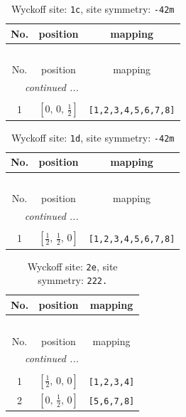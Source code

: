 \documentclass[fleqn,8pt]{jsarticle}
\begin{document}
\begin{longtable}{ccc}
\caption{Wyckoff site: {\tt 1c}, site symmetry: {\tt -42m}}
 \\
 \hline \hline
No. & position & mapping \\ \hline \endfirsthead

\multicolumn{2}{l}{\tablename\ \thetable{}} \\
 \hline \hline
No. & position & mapping \\ \hline \endhead

 \hline \hline
\multicolumn{2}{r}{\footnotesize\it continued ...} \\ \endfoot

 \hline \hline
\multicolumn{2}{r}{} \\ \endlastfoot

1 & $\left[ 0,\, 0,\, \frac{1}{2} \right]$ & {\tt [1,2,3,4,5,6,7,8]} \\
\end{longtable}
\renewcommand{\arraystretch}{1.2}
\begin{longtable}{ccc}
\caption{Wyckoff site: {\tt 1d}, site symmetry: {\tt -42m}}
 \\
 \hline \hline
No. & position & mapping \\ \hline \endfirsthead

\multicolumn{2}{l}{\tablename\ \thetable{}} \\
 \hline \hline
No. & position & mapping \\ \hline \endhead

 \hline \hline
\multicolumn{2}{r}{\footnotesize\it continued ...} \\ \endfoot

 \hline \hline
\multicolumn{2}{r}{} \\ \endlastfoot

1 & $\left[ \frac{1}{2},\, \frac{1}{2},\, 0 \right]$ & {\tt [1,2,3,4,5,6,7,8]} \\
\end{longtable}
\renewcommand{\arraystretch}{1.2}
\begin{longtable}{ccc}
\caption{Wyckoff site: {\tt 2e}, site symmetry: {\tt 222.}}
 \\
 \hline \hline
No. & position & mapping \\ \hline \endfirsthead

\multicolumn{2}{l}{\tablename\ \thetable{}} \\
 \hline \hline
No. & position & mapping \\ \hline \endhead

 \hline \hline
\multicolumn{2}{r}{\footnotesize\it continued ...} \\ \endfoot

 \hline \hline
\multicolumn{2}{r}{} \\ \endlastfoot

1 & $\left[ \frac{1}{2},\, 0,\, 0 \right]$ & {\tt [1,2,3,4]} \\ \hline
2 & $\left[ 0,\, \frac{1}{2},\, 0 \right]$ & {\tt [5,6,7,8]} \\
\end{longtable}
\end{document}
